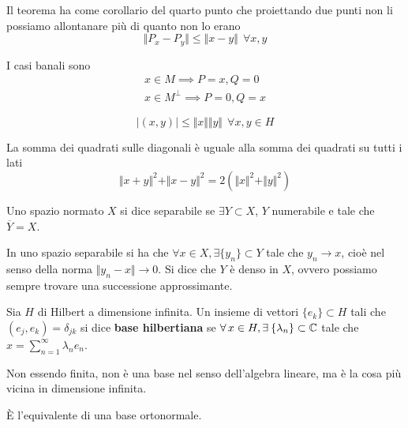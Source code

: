 Il teorema ha come corollario del quarto punto che proiettando due punti non li possiamo allontanare più di quanto non lo erano
\begin{equation*}
\Vert P_{x} - P_{y} \Vert \leq \Vert x - y \Vert \ \ \forall x, y
\end{equation*}
\begin{rem}
I casi banali sono
\begin{gather*}
x\in M\implies P = x, Q = 0\\
x\in M^{\perp} \implies P = 0, Q = x
\end{gather*}
\end{rem}
\begin{thm}
\begin{equation*}
| (x, y)| \leq \Vert x \Vert \Vert y \Vert \ \ \forall x, y\in H
\end{equation*}
\end{thm}
\begin{thm}
 La somma dei quadrati sulle diagonali è uguale alla somma dei quadrati su tutti i lati
\begin{equation*}
\Vert x + y \Vert^{2} + \Vert x - y \Vert^{2} = 2\left(\Vert x \Vert^{2} + \Vert y \Vert^{2}\right)
\end{equation*}
\end{thm}
\begin{defn}
Uno spazio normato $X$ si dice separabile se $\exists Y\subset X$, $Y$ numerabile e tale che $\overline{Y} = X$.
\end{defn}
In uno spazio separabile si ha che $\forall x\in X, \exists \{y_{n}\} \subset Y$ tale che $y_{n}\rightarrow x$, cioè nel senso della norma $ \Vert y_{n} - x \Vert \rightarrow 0$. Si dice che $Y$ è denso in $X$, ovvero possiamo sempre trovare una successione approssimante.
\begin{defn}
Sia $H$ di Hilbert a dimensione infinita. Un insieme di vettori $\{e_{k}\} \subset H$ tali che $(e_{j}, e_{k}) = \delta_{jk}$ si dice \textbf{base hilbertiana} se $\forall x\in H, \exists \{\lambda_{n}\} \subset \CC$ tale che $x = \sum^{\infty}_{n = 1} \lambda_{n} e_{n}$.
\end{defn}
\begin{rem}
Non essendo finita, non è una base nel senso dell'algebra lineare, ma è la cosa più vicina in dimensione infinita.
\end{rem}
\begin{rem}
È l'equivalente di una base ortonormale.
\end{rem}
